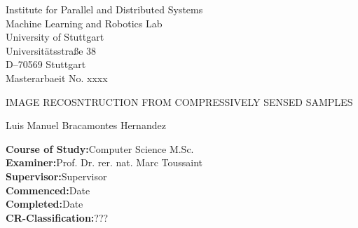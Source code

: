 \begin{titlepage}

\centering
\sffamily
%
\small
Institute for Parallel and Distributed Systems \\
Machine Learning and Robotics Lab\\
\null\vspace{0.5cm}
University of Stuttgart\\
Universitätsstraße 38\\
D–70569 Stuttgart\\

\null\vspace{1cm}
Masterarbaeit No. xxxx

\large
\null\vspace{1.5cm}
{\huge IMAGE RECOSNTRUCTION FROM COMPRESSIVELY SENSED SAMPLES \\[12pt] 
} 
\null\vspace{0.2cm}

\small
Luis Manuel Bracamontes Hernandez

\raggedright
\null\vspace{1.5cm}
\textbf{Course of Study:}\null\hspace{0.1cm}Computer Science M.Sc.\\
\null\vspace{0.7cm}
\textbf{Examiner:}\null\hspace{0.1cm}Prof. Dr. rer. nat. Marc Toussaint\\
\null\vspace{0.01cm}
\textbf{Supervisor:}\null\hspace{0.1cm}Supervisor\\
\null\vspace{1cm}
\textbf{Commenced:}\null\hspace{0.1cm}Date\\
\null\vspace{0.01cm}
\textbf{Completed:}\null\hspace{0.1cm}Date\\
\null\vspace{1cm}
\textbf{CR-Classification:}\null\hspace{0.1cm}???\\


\vspace{2cm}
\end{titlepage}



